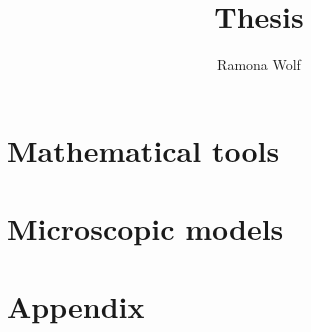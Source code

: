 \documentclass[a4paper,twoside,11pt]{amsbook}
\title{Thesis}
\author{Ramona Wolf}
\numberwithin{section}{chapter}
\numberwithin{equation}{chapter}
\theoremstyle{definition}
\begin{document}

\newpage

\frontmatter

\newpage

\newpage

\newpage



\newpage
\tableofcontents
\newpage

\mainmatter





\part{Mathematical tools}








\part{Microscopic models}

%






\part*{Appendix}
\appendix





\backmatter

\def\backref#1{{\scriptsize $\hookrightarrow$ [#1]}}




\printindex


\end{document}
